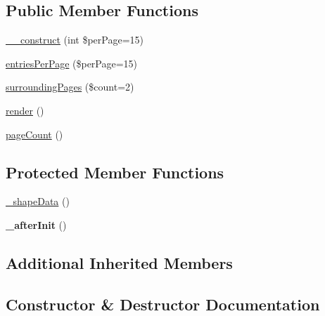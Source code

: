 \subsection*{Public Member Functions}
\begin{DoxyCompactItemize}
\item 
\hyperlink{classhamburgscleanest_1_1_data_tables_1_1_models_1_1_data_components_1_1_paginator_abc3963927c17e1a03f685cafe82e217b}{\+\_\+\+\_\+construct} (int \$per\+Page=15)
\item 
\hyperlink{classhamburgscleanest_1_1_data_tables_1_1_models_1_1_data_components_1_1_paginator_a5e68817e5b1382d72237b5b0aa0c543e}{entries\+Per\+Page} (\$per\+Page=15)
\item 
\hyperlink{classhamburgscleanest_1_1_data_tables_1_1_models_1_1_data_components_1_1_paginator_ab4a99d48dee7f0f1202d66439dbc0c5b}{surrounding\+Pages} (\$count=2)
\item 
\hyperlink{classhamburgscleanest_1_1_data_tables_1_1_models_1_1_data_components_1_1_paginator_afde88292c44dc59faf017738dae6dffb}{render} ()
\item 
\hyperlink{classhamburgscleanest_1_1_data_tables_1_1_models_1_1_data_components_1_1_paginator_a29cca2e4eba71144e202922486e55e99}{page\+Count} ()
\end{DoxyCompactItemize}
\subsection*{Protected Member Functions}
\begin{DoxyCompactItemize}
\item 
\hyperlink{classhamburgscleanest_1_1_data_tables_1_1_models_1_1_data_components_1_1_paginator_a6d4fda1024fd883f0750e5f0c531160d}{\+\_\+shape\+Data} ()
\item 
\mbox{\label{classhamburgscleanest_1_1_data_tables_1_1_models_1_1_data_components_1_1_paginator_a8b97dff3fa609aaed04b448e535ba0cc}} 
{\bfseries \+\_\+after\+Init} ()
\end{DoxyCompactItemize}
\subsection*{Additional Inherited Members}


\subsection{Constructor \& Destructor Documentation}
\mbox{\label{classhamburgscleanest_1_1_data_tables_1_1_models_1_1_data_components_1_1_paginator_abc3963927c17e1a03f685cafe82e217b}} 
